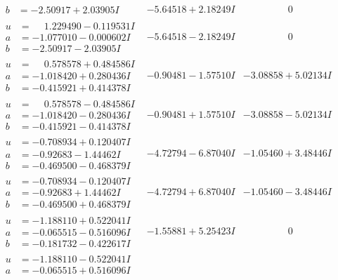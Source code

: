 \documentclass[1p]{elsarticle_modified}
\theoremstyle{definition}
\begin{document}
$$\begin{array}{c|c|c}
\begin{aligned}
b &= -2.50917 + 2.03905 I\end{aligned}
 & -5.64518 + 2.18249 I & \phantom{-0.000000 } 0 \\ \hline\begin{aligned}
u &= \phantom{-}1.229490 - 0.119531 I \\
a &= -1.077010 - 0.000602 I \\
b &= -2.50917 - 2.03905 I\end{aligned}
 & -5.64518 - 2.18249 I & \phantom{-0.000000 } 0 \\ \hline\begin{aligned}
u &= \phantom{-}0.578578 + 0.484586 I \\
a &= -1.018420 + 0.280436 I \\
b &= -0.415921 + 0.414378 I\end{aligned}
 & -0.90481 - 1.57510 I & -3.08858 + 5.02134 I \\ \hline\begin{aligned}
u &= \phantom{-}0.578578 - 0.484586 I \\
a &= -1.018420 - 0.280436 I \\
b &= -0.415921 - 0.414378 I\end{aligned}
 & -0.90481 + 1.57510 I & -3.08858 - 5.02134 I \\ \hline\begin{aligned}
u &= -0.708934 + 0.120407 I \\
a &= -0.92683 - 1.44462 I \\
b &= -0.469500 - 0.468379 I\end{aligned}
 & -4.72794 - 6.87040 I & -1.05460 + 3.48446 I \\ \hline\begin{aligned}
u &= -0.708934 - 0.120407 I \\
a &= -0.92683 + 1.44462 I \\
b &= -0.469500 + 0.468379 I\end{aligned}
 & -4.72794 + 6.87040 I & -1.05460 - 3.48446 I \\ \hline\begin{aligned}
u &= -1.188110 + 0.522041 I \\
a &= -0.065515 - 0.516096 I \\
b &= -0.181732 - 0.422617 I\end{aligned}
 & -1.55881 + 5.25423 I & \phantom{-0.000000 } 0 \\ \hline\begin{aligned}
u &= -1.188110 - 0.522041 I \\
a &= -0.065515 + 0.516096 I \\

\end{aligned}
\end{array}$$
\end{document}
